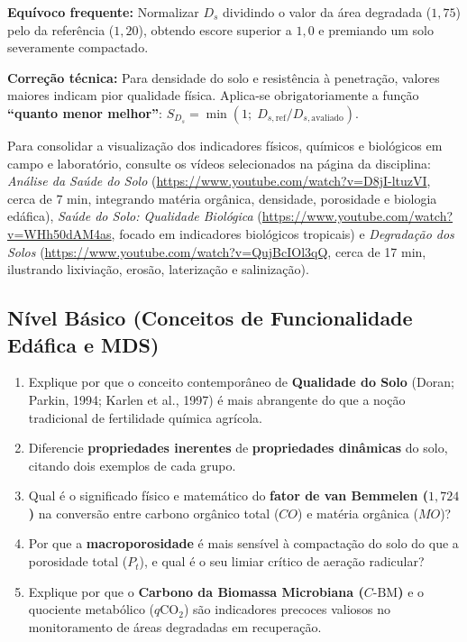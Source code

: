 \begin{boxErro}
\textbf{Equívoco frequente:} Normalizar $D_s$ dividindo o valor da área degradada ($1{,}75$) pelo da referência ($1{,}20$), obtendo escore superior a $1{,}0$ e premiando um solo severamente compactado.\par
\textbf{Correção técnica:} Para densidade do solo e resistência à penetração, valores maiores indicam pior qualidade física. Aplica-se obrigatoriamente a função \textbf{``quanto menor melhor''}: $S_{D_s} = \min(1;\; D_{s,\text{ref}} / D_{s,\text{avaliado}})$.
\end{boxErro}

Para consolidar a visualização dos indicadores físicos, químicos e biológicos em campo e laboratório, consulte os vídeos selecionados na página da disciplina: \textit{Análise da Saúde do Solo} (\url{https://www.youtube.com/watch?v=D8jI-ltuzVI}, cerca de 7 min, integrando matéria orgânica, densidade, porosidade e biologia edáfica), \textit{Saúde do Solo: Qualidade Biológica} (\url{https://www.youtube.com/watch?v=WHh50dAM4as}, focado em indicadores biológicos tropicais) e \textit{Degradação dos Solos} (\url{https://www.youtube.com/watch?v=QujBcIOl3qQ}, cerca de 17 min, ilustrando lixiviação, erosão, laterização e salinização).


\subsection*{Nível Básico (Conceitos de Funcionalidade Edáfica e MDS)}

\begin{enumerate}[leftmargin=1.8em, itemsep=6pt]
  \item Explique por que o conceito contemporâneo de \textbf{Qualidade do Solo} (Doran; Parkin, 1994; Karlen et al., 1997) é mais abrangente do que a noção tradicional de fertilidade química agrícola.
  \espacoResolucao[1.8cm]

  \item Diferencie \textbf{propriedades inerentes} de \textbf{propriedades dinâmicas} do solo, citando dois exemplos de cada grupo.
  \espacoResolucao[1.8cm]

  \item Qual é o significado físico e matemático do \textbf{fator de van Bemmelen ($1{,}724$)} na conversão entre carbono orgânico total ($CO$) e matéria orgânica ($MO$)?
  \espacoResolucao[1.8cm]

  \item Por que a \textbf{macroporosidade} é mais sensível à compactação do solo do que a porosidade total ($P_t$), e qual é o seu limiar crítico de aeração radicular?
  \espacoResolucao[1.8cm]

  \item Explique por que o \textbf{Carbono da Biomassa Microbiana ($C\text{-BM}$)} e o quociente metabólico ($q\text{CO}_2$) são indicadores precoces valiosos no monitoramento de áreas degradadas em recuperação.
  \espacoResolucao[1.8cm]
\end{enumerate}

